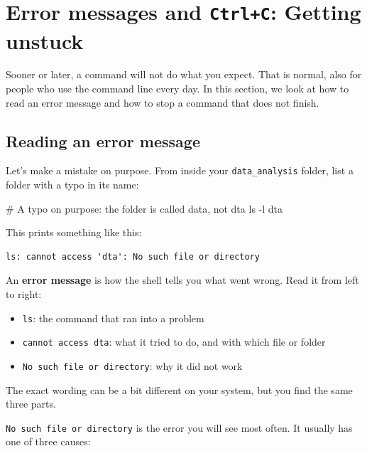\documentclass[
  letterpaper,
  DIV=11,
  numbers=noendperiod]{scrreprt}
\newenvironment{Shaded}{}{}
\newcommand{\AttributeTok}[1]{\textcolor[rgb]{0.84,0.23,0.29}{#1}}
\newcommand{\CommentTok}[1]{\textcolor[rgb]{0.42,0.45,0.49}{#1}}
\newcommand{\FunctionTok}[1]{\textcolor[rgb]{0.44,0.26,0.76}{#1}}
\newcommand{\NormalTok}[1]{\textcolor[rgb]{0.14,0.16,0.18}{#1}}
\providecommand{\tightlist}{%
  \setlength{\itemsep}{0pt}\setlength{\parskip}{0pt}}
\begin{document}
\section{\texorpdfstring{Error messages and \texttt{Ctrl+C}: Getting
unstuck}{Error messages and Ctrl+C: Getting unstuck}}\label{error-messages-and-ctrlc-getting-unstuck}

Sooner or later, a command will not do what you expect. That is normal,
also for people who use the command line every day. In this section, we
look at how to read an error message and how to stop a command that does
not finish.

\subsection{Reading an error message}\label{reading-an-error-message}

Let's make a mistake on purpose. From inside your
\texttt{data\_analysis} folder, list a folder with a typo in its name:

\begin{Shaded}
\begin{Highlighting}[]
\CommentTok{\# A typo on purpose: the folder is called data, not dta}
\FunctionTok{ls} \AttributeTok{{-}l}\NormalTok{ dta}
\end{Highlighting}
\end{Shaded}

This prints something like this:

\begin{verbatim}
ls: cannot access 'dta': No such file or directory
\end{verbatim}

An \textbf{error message} is how the shell tells you what went wrong.
Read it from left to right:

\begin{itemize}
\tightlist
\item
  \texttt{ls}: the command that ran into a problem
\item
  \texttt{cannot\ access\ \textquotesingle{}dta\textquotesingle{}}: what
  it tried to do, and with which file or folder
\item
  \texttt{No\ such\ file\ or\ directory}: why it did not work
\end{itemize}

The exact wording can be a bit different on your system, but you find
the same three parts.

\texttt{No\ such\ file\ or\ directory} is the error you will see most
often. It usually has one of three causes:
\end{document}
